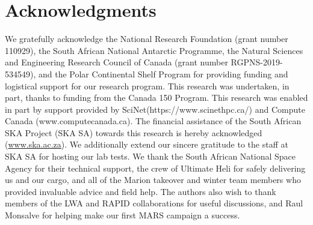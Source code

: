\documentclass{ws-jai}
\begin{document}
\section*{Acknowledgments}

We gratefully acknowledge the National Research Foundation (grant
number 110929), the South African National Antarctic Programme, the
Natural Sciences and Engineering Research Council of Canada (grant
number RGPNS-2019-534549), and the Polar Continental Shelf Program for
providing funding and logistical support for our research program.
This research was undertaken, in part, thanks to funding from the
Canada 150 Program.  This research was enabled in part by support
provided by SciNet(https://www.scinethpc.ca/) and Compute Canada
(www.computecanada.ca).  The financial assistance of the South
African SKA Project (SKA SA) towards this research is hereby
acknowledged (\url{www.ska.ac.za}).  We additionally extend our
sincere gratitude to the staff at SKA SA for hosting our lab tests.
We thank the South African National Space Agency for their technical
support, the crew of Ultimate Heli for safely delivering us and our
cargo, and all of the Marion takeover and winter team members who
provided invaluable advice and field help.  The authors also wish to
thank members of the LWA and RAPID collaborations for useful
discussions, and Raul Monsalve for helping make our first MARS
campaign a success.


{}
\end{document}
